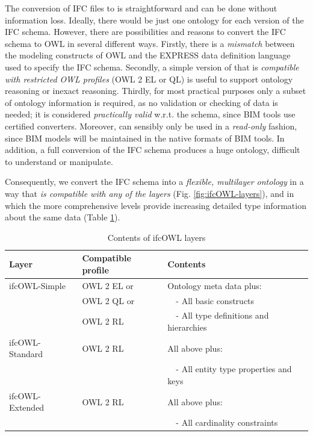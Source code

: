 The conversion of IFC files to \ifcrdf{} is straightforward and can be done 
without information loss.
Ideally, there would be just one \ifcowl{} ontology for each version of the IFC schema. However,
there are possibilities and reasons to convert the IFC schema to OWL in several different ways. Firstly, there is a \emph{mismatch} between the modeling constructs of OWL and the 
EXPRESS data definition language \cite{schenck1994information} used to specify the IFC schema. Secondly, a simple version of \ifcowl{} that is \emph{compatible with
restricted OWL profiles} (OWL 2 EL or QL) \cite{motik2012owl} is useful to support ontology
reasoning or inexact reasoning. Thirdly, for most practical purposes only a subset of ontology
information is required, as no validation or checking of \ifcrdf{} data is needed; it is considered \emph{practically valid} w.r.t. the schema, since BIM tools use certified converters. Moreover, \ifcrdf{} can sensibly only be used in a
\emph{read-only} fashion, since BIM models will be maintained in the native formats of BIM
tools. In addition, a full conversion of the IFC schema produces a huge ontology, difficult to understand or manipulate.

Consequently, we convert the IFC schema into a \emph{flexible, multilayer \ifcowl{} ontology}
in a way that \emph{\ifcrdf{} is compatible with any of the layers} (Fig. \ref{fig:ifcOWL-layers}), and in which 
the more comprehensive levels %
provide increasing detailed type information about the same \ifcrdf{} data (Table \ref{tab:ifcOWL-layers}).

\begin{table}[b]
    \caption{Contents of ifcOWL layers}
    \label{tab:ifcOWL-layers}
    \centering
    \scriptsize
    \def\arraystretch{1.2}          %
    \setlength{\tabcolsep}{6pt}     %
    \begin{tabularx}{0.95\textwidth}{|l|l|X|}
        \hline
            \textbf{Layer} & \textbf{Compatible profile} & \textbf{Contents} \\
        \hline
            ifcOWL-Simple & OWL 2 EL or & Ontology meta data plus: \\
            & OWL 2 QL or & \ \ - All basic constructs \\
            & OWL 2 RL & \ \ - All type definitions and hierarchies \\
        \hline 
            ifcOWL-Standard & OWL 2 RL & All above plus: \\
            & & \ \ - All entity type properties and keys \\
        \hline
            ifcOWL-Extended & OWL 2 RL & All above plus: \\
            & & \ \ - All cardinality constraints \\
        \hline
    \end{tabularx}
\end{table}

